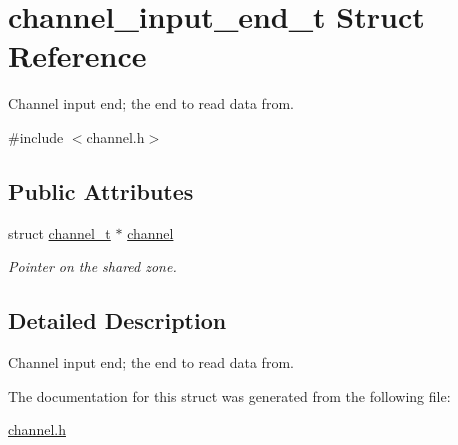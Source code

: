 \hypertarget{structchannel__input__end__t}{\section{channel\-\_\-input\-\_\-end\-\_\-t Struct Reference}
\label{structchannel__input__end__t}
}


Channel input end; the end to read data from.  




{\ttfamily \#include $<$channel.\-h$>$}

\subsection*{Public Attributes}
\begin{DoxyCompactItemize}
\item 
\hypertarget{structchannel__input__end__t_aa63c7db8c6475654ea086c7ff8065107}{struct \hyperlink{structchannel__t}{channel\-\_\-t} $\ast$ \hyperlink{structchannel__input__end__t_aa63c7db8c6475654ea086c7ff8065107}{channel}}\label{structchannel__input__end__t_aa63c7db8c6475654ea086c7ff8065107}

\begin{DoxyCompactList}\small\item\em Pointer on the shared zone. \end{DoxyCompactList}\end{DoxyCompactItemize}


\subsection{Detailed Description}
Channel input end; the end to read data from. 

The documentation for this struct was generated from the following file\-:\begin{DoxyCompactItemize}
\item 
\hyperlink{channel_8h}{channel.\-h}\end{DoxyCompactItemize}
